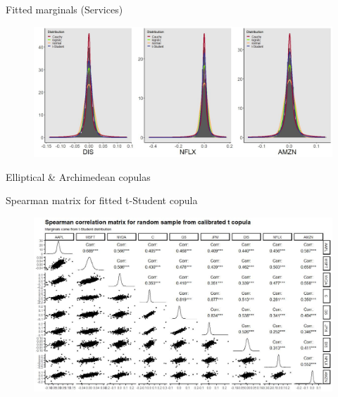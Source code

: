 \documentclass{beamer}
\begin{document}
\begin{frame}{Fitted marginals (Services)}

\centering
\begin{figure}[!h]
  \centering
    \includegraphics[width=1\textwidth]{figures/marginals/services_comapnies.jpeg}
\end{figure}
    
\end{frame}

\begin{frame}{Elliptical \& Archimedean copulas}

\centering
\begin{table}
   
\end{table}

\end{frame}

\begin{frame}{Spearman matrix for fitted t-Student copula}
\centering
\begin{figure}[!h]
  \centering
    \includegraphics[width=1\textwidth]{figures/correlation/spearman_copula_t_seed_123.jpeg}
\end{figure}
    
\end{frame}
\end{document}
